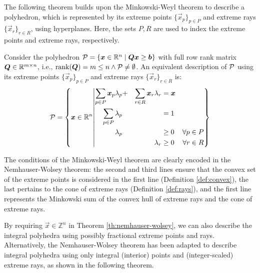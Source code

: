 The following theorem builds upon the Minkowski-Weyl theorem to describe a polyhedron, which is represented by its extreme points $\{\vec{x}_p\}_{p \in P}$ and extreme rays $\{\vec{x}_r\}_{r \in R}$, using hyperplanes. Here, the sets $P, R$ are used to index the extreme points and extreme rays, respectively.

\begin{theorem}\label{th:nemhauser-wolsey}
Consider the polyhedron $\mathcal{P} = \{{\bm{x}} \in \mathbb{R}^n \mid {\bm{Q}} {\bm{x}} \geq {\bm{b}}\}$ with full row rank matrix ${\bm{Q}} \in \mathbb{R}^{m \times n}$, i.e., $\operatorname{rank}({\bm{Q}}) = m \leq n \land \mathcal{P} \neq \emptyset$.
An equivalent description of $\mathcal{P}$ using its extreme points $\{\vec{x}_p\}_{p \in P}$ and extreme rays $\{\vec{x}_r\}_{r \in R}$ is:
\begin{equation}
\mathcal{P} = \left\{ {\bm{x}} \in \mathbb{R}^n \middle\vert
\begin{aligned}
\sum_{p \in P} {\bm{x}}_p \lambda_p &+ &\sum_{r \in R} {\bm{x}}_r \lambda_r &= {\bm{x}} &\\
\sum_{p \in P} \lambda_p & & &= 1 &\\
\lambda_p & & &\geq 0 &\forall p \in P\\
& &\lambda_r &\geq 0 &\forall r \in R
\end{aligned}
\right\}
\end{equation}
\end{theorem}

The conditions of the Minkowski-Weyl theorem are clearly encoded in the Nemhauser-Wolsey theorem: the second and third lines ensure that the convex set of the extreme points is considered in the first line (Definition \ref{def:convex}), the last pertains to the cone of extreme rays (Definition \ref{def:rays}), and the first line represents the Minkowski sum of the convex hull of extreme rays and the cone of extreme rays.

By requiring $\vec{x} \in \mathbb{Z}^n$ in Theorem \ref{th:nemhauser-wolsey}, we can also describe the integral polyhedra using possibly fractional extreme points and rays. Alternatively, the Nemhauser-Wolsey theorem has been adapted to describe integral polyhedra using only integral (interior) points and (integer-scaled) extreme rays, as shown in the following theorem.

